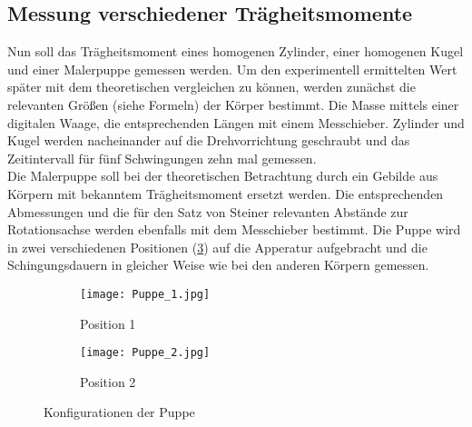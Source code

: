\subsection{Messung verschiedener Trägheitsmomente}
Nun soll das Trägheitsmoment eines homogenen Zylinder, einer homogenen Kugel und einer
Malerpuppe gemessen werden. Um den experimentell ermittelten Wert später mit dem theoretischen
vergleichen zu können, werden zunächst die relevanten Größen (siehe Formeln) der Körper
bestimmt. Die Masse mittels einer digitalen Waage, die entsprechenden Längen mit einem
Messchieber. Zylinder und Kugel werden nacheinander auf die Drehvorrichtung geschraubt und
das Zeitintervall für fünf Schwingungen zehn mal gemessen. \\
Die Malerpuppe soll bei der theoretischen Betrachtung durch ein Gebilde aus Körpern mit
bekanntem Trägheitsmoment ersetzt werden. Die entsprechenden Abmessungen und die für den Satz
von Steiner relevanten Abstände zur Rotationsachse werden ebenfalls mit dem Messchieber bestimmt.
Die Puppe wird in zwei verschiedenen Positionen (\ref{fig:konfig}) auf die Apperatur aufgebracht
und die Schingungsdauern in gleicher Weise wie bei den anderen Körpern gemessen. \\

\begin{figure}
\centering
\begin{subfigure}{0.48\textwidth}
\centering
\texttt{[image: Puppe\_1.jpg]}
\caption{Position 1}
\label{fig:pup1}
\end{subfigure}
\begin{subfigure}{0.48\textwidth}
\centering
\texttt{[image: Puppe\_2.jpg]}
\caption{Position 2}
\label{fig:pup2}
\end{subfigure}
\caption{Konfigurationen der Puppe}
\label{fig:konfig}
\end{figure}
